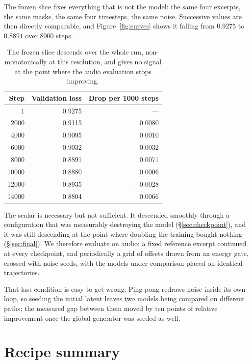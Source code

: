 \documentclass[10pt,twocolumn,letterpaper]{article}
\begin{document}
The frozen slice fixes everything that is not the model: the same four excerpts,
the same masks, the same four timesteps, the same noise. Successive values are
then directly comparable, and Figure~\ref{fig:curves} shows it falling from
$0.9275$ to $0.8891$ over 8000 steps.

\begin{table}[t]
\centering
\small
\begin{tabular}{rrr}
\toprule
Step & Validation loss & Drop per 1000 steps \\
\midrule
1     & 0.9275 & --- \\
2000  & 0.9115 & 0.0080 \\
4000  & 0.9095 & 0.0010 \\
6000  & 0.9032 & 0.0032 \\
8000  & 0.8891 & 0.0071 \\
10000 & 0.8880 & 0.0006 \\
12000 & 0.8935 & $-0.0028$ \\
14000 & 0.8804 & 0.0066 \\
\bottomrule
\end{tabular}
\caption{The frozen slice descends over the whole run, non-monotonically at this
resolution, and gives no signal at the point where the audio evaluation stops
improving.}
\label{tab:val}
\end{table}

The scalar is necessary but not sufficient. It descended smoothly through a
configuration that was measurably destroying the model (\S\ref{sec:checkpoint}),
and it was still descending at the point where doubling the training bought
nothing (\S\ref{sec:final}). We therefore evaluate on audio: a fixed reference
excerpt continued at every checkpoint, and periodically a grid of offsets drawn
from an energy gate, crossed with noise seeds, with the models under comparison
placed on identical trajectories.

That last condition is easy to get wrong. Ping-pong redraws noise inside its own
loop, so seeding the initial latent leaves two models being compared on different
paths; the measured gap between them moved by ten points of relative improvement
once the global generator was seeded as well.

\section{Recipe summary}
\end{document}
